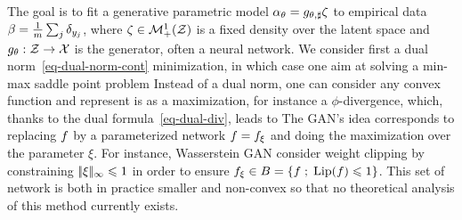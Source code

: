 The goal is to fit a generative parametric model $\alpha_\theta = g_{\theta,\sharp} \zeta$ to empirical data $\beta = \frac{1}{m}\sum_{j} \delta_{y_j}$, where $\zeta \in \mathcal{M}_+^1(\mathcal{Z})$ is a fixed density over the latent space and $g_\theta : \mathcal{Z} \rightarrow \mathcal{X}$ is the generator, often a neural network. We consider first a dual norm~\eqref{eq-dual-norm-cont} minimization, in which case one aim at solving a min-max saddle point problem
Instead of a dual norm, one can consider any convex function and represent is as a maximization,  for instance a $\phi$-divergence, which, thanks to the dual formula~\eqref{eq-dual-div}, leads to
The GAN's idea corresponds to replacing $f$ by a parameterized network $f=f_\xi$ and doing the maximization over the parameter $\xi$. For instance, Wasserstein GAN consider weight clipping by constraining $|\!| \xi |\!|_\infty \leqslant 1$ in order to ensure $f_\xi \in B = \left\{ f \;;\; \operatorname{Lip}(f) \leqslant 1 \right\}$. This set of network is both in practice smaller and non-convex so that no theoretical analysis of this method currently exists.